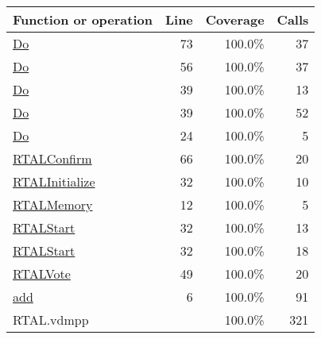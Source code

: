 \bigskip
\begin{longtable}{|l|r|r|r|}
\hline
Function or operation & Line & Coverage & Calls \\
\hline
\hline
\hyperref[Do:73]{Do} & 73&100.0\% & 37 \\
\hline
\hyperref[Do:56]{Do} & 56&100.0\% & 37 \\
\hline
\hyperref[Do:39]{Do} & 39&100.0\% & 13 \\
\hline
\hyperref[Do:39]{Do} & 39&100.0\% & 52 \\
\hline
\hyperref[Do:24]{Do} & 24&100.0\% & 5 \\
\hline
\hyperref[RTALConfirm:66]{RTALConfirm} & 66&100.0\% & 20 \\
\hline
\hyperref[RTALInitialize:32]{RTALInitialize} & 32&100.0\% & 10 \\
\hline
\hyperref[RTALMemory:12]{RTALMemory} & 12&100.0\% & 5 \\
\hline
\hyperref[RTALStart:32]{RTALStart} & 32&100.0\% & 13 \\
\hline
\hyperref[RTALStart:32]{RTALStart} & 32&100.0\% & 18 \\
\hline
\hyperref[RTALVote:49]{RTALVote} & 49&100.0\% & 20 \\
\hline
\hyperref[add:6]{add} & 6&100.0\% & 91 \\
\hline
\hline
RTAL.vdmpp & & 100.0\% & 321 \\
\hline
\end{longtable}

